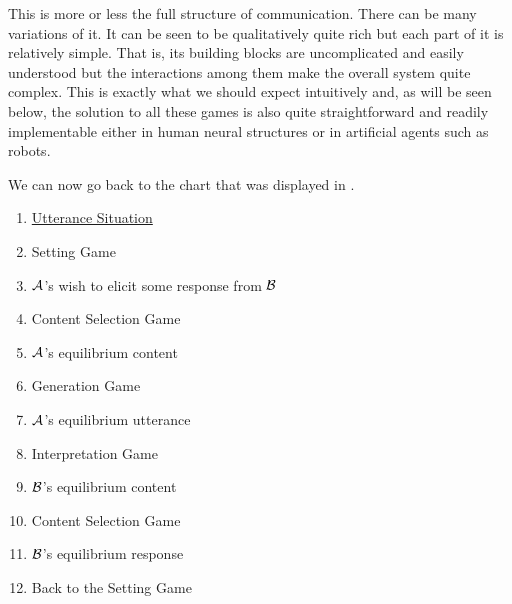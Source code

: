 This is more or less the full structure of communication. There can be many variations of it. It can be seen to be qualitatively quite rich but each part of it is relatively simple. That is, its building blocks are uncomplicated and easily understood but the interactions among them make the overall system quite complex. This is exactly what we should expect intuitively and, as will be seen below, the solution to all these games is also quite straightforward and readily implementable either in human neural structures or in artificial agents such as robots. 

We can now go back to the chart that was displayed in .\largerpage

\begin{enumerate}[itemsep=0pt]
\item[] \underline{Utterance Situation} 
\item[] Setting Game
\item[\functionarrow] $\cal A$'s wish to elicit some response from $\cal B$
\item[\functionarrow] Content Selection Game
\item[\functionarrow] $\cal A$'s equilibrium content
\item[\functionarrow] Generation Game
\item[\functionarrow] $\cal A$'s equilibrium utterance
\item[\functionarrow] Interpretation Game
\item[\functionarrow] $\cal B$'s equilibrium content
\item[\functionarrow] Content Selection Game
\item[\functionarrow] $\cal B$'s equilibrium response
\item[\functionarrow] Back to the Setting Game
\end{enumerate}
